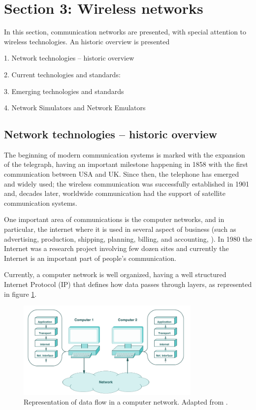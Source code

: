 



\section{Section 3: Wireless networks}

In this section, communication networks are presented, with special attention to wireless technologies. An historic overview is presented 



1.	Network technologies – historic overview

2.	Current technologies and standards:

3.	Emerging technologies and standards

4.	Network Simulators and Network Emulators






\subsection{Network technologies – historic overview}

The beginning of modern communication systems is marked with the expansion of the telegraph, having an important milestone happening in 1858 with the first communication between USA and UK. Since then, the telephone has emerged and widely used; the wireless communication was successfully established in 1901 and, decades later, worldwide communication had the support of satellite communication systems.

One important area of communications is the computer networks, and in particular, the internet where it is used in several aspect of business (such as advertising, production, shipping, planning, billing, and accounting, \cite{comer2008}). In 1980 the Internet was a research project involving few dozen sites and currently the Internet is an important part of people’s communication.

Currently, a computer network is well organized, having a well structured Internet Protocol (IP) that defines how data passes through layers, as represented in figure \ref{fig:comer2008}.

	\begin{figure}[h!]
	\centering
	\includegraphics[width=0.8\textwidth,keepaspectratio]{figures/33.WirelessN/comer2008}
	\caption{Representation of data flow in a computer network. Adapted from \cite{comer2008}.}
	\label{fig:comer2008}
\end{figure}


